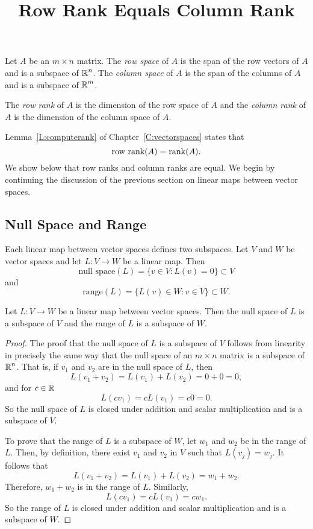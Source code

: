 \documentclass{ximera}
\title{Row Rank Equals Column Rank}
\begin{document}
\begin{abstract}
\end{abstract}
\maketitle

 \label{S:5.8}

Let $A$ be an $m\times n$ matrix.  The {\em row space\/}
 of $A$ is the span of the row vectors of $A$
and is a subspace of $\mbox{$\Bbb{R}$}^n$.  The {\em column space\/}
 of $A$ is the span of the columns of $A$
and is a subspace of $\mbox{$\Bbb{R}$}^m$.
\begin{Def} 
The {\em row rank\/} of $A$ is the dimension of the
row space of $A$ and the {\em column rank\/} of $A$ is the
dimension of the column space of $A$.
\end{Def}   
Lemma~\ref{L:computerank} of Chapter~\ref{C:vectorspaces} states that
\[
\mbox{row rank}(A) = {\rm rank}(A).
\]
We show below that row ranks and column ranks are equal.  We
begin by continuing the discussion of the previous section on linear maps
between vector spaces.

\subsection*{Null Space and Range}

Each linear map between vector spaces defines two subspaces.  Let $V$ and $W$ 
be vector spaces and let $L:V\to W$ be a linear map.  Then
\[
\mbox{null space}(L) = \{v\in V: L(v)=0\} \subset V
\]
 and 
\[
\mbox{range}(L) = \{L(v)\in W: v\in V \} \subset W.
\]

\begin{lemma} \label{L:nsr}
Let $L:V\to W$ be a linear map between vector spaces.  Then the null space of
$L$ is a subspace of $V$ and the range of $L$ is a subspace of $W$.
\end{lemma}

\begin{proof}  The proof that the null space of $L$ is a subspace of $V$ follows
from linearity in precisely the same way that the null space of an
$m\times n$ matrix is a subspace of $\mbox{$\Bbb{R}$}^n$.  That is, if $v_1$ and $v_2$ are
in the null space of $L$, then
\[
L(v_1+v_2) = L(v_1) + L(v_2) = 0 + 0 = 0,
\]
and for $c\in\mbox{$\Bbb{R}$}$
\[
L(cv_1) = cL(v_1) = c0 = 0.
\]
So the null space of $L$ is closed under addition and scalar multiplication
and is a subspace of $V$.

To prove that the range of $L$ is a subspace of $W$, let $w_1$ and $w_2$ be
in the range of $L$.  Then, by definition, there exist $v_1$ and $v_2$ in $V$
such that $L(v_j)=w_j$.  It follows that
\[
L(v_1+v_2) = L(v_1) + L(v_2) = w_1 + w_2.
\]
Therefore, $w_1+w_2$ is in the range of $L$.  Similarly,
\[
L(cv_1) = cL(v_1) = cw_1.
\]
So the range of $L$ is closed under addition and scalar multiplication and is
a subspace of $W$.  \end{proof}
\end{document}
